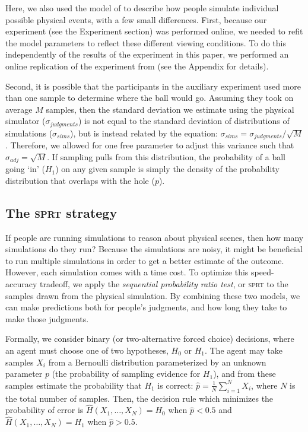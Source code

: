 \documentclass[10pt,letterpaper]{article}
\begin{document}
Here, we also used the model of  to describe how people simulate individual possible physical events, with a few small differences.
First, because our experiment (see the Experiment section) was performed online, we needed to refit the model parameters to reflect these different viewing conditions.
To do this independently of the results of the experiment in this paper, we performed an online replication of the experiment from  (see the Appendix for details).

Second, it is possible that the participants in the auxiliary experiment used more than one sample to determine where the ball would go.
Assuming they took on average $M$ samples, then the standard deviation we estimate using the physical simulator ($\sigma_{judgments}$) is not equal to the standard deviation of distributions of simulations ($\sigma_{sims}$), but is instead related by the equation: $\sigma_{sims} = \sigma_{judgments} / \sqrt{M}$.
Therefore, we allowed for one free parameter to adjust this variance such that $\sigma_{adj}=\sqrt{M}$.
If sampling pulls from this distribution, the probability of a ball going `in' ($H_1$) on any given sample is simply the density of the probability distribution that overlaps with the hole ($p$).

\subsection{The \textsc{sprt} strategy}

If people are running simulations to reason about physical scenes, then how many simulations do they run?
Because the simulations are noisy, it might be beneficial to run multiple simulations in order to get a better estimate of the outcome.
However, each simulation comes with a time cost.
To optimize this speed-accuracy tradeoff, we apply the \emph{sequential probability ratio test}, or \textsc{sprt} \cite{wald1947sequential} to the samples drawn from the physical simulation.
By combining these two models, we can make predictions both for people's judgments, and how long they take to make those judgments.

Formally, we consider binary (or two-alternative forced choice) decisions, where an agent must choose one of two hypotheses, $H_0$ or $H_1$. 
The agent may take samples $X_i$ from a Bernoulli distribution parameterized by an unknown parameter $p$ (the probability of sampling evidence for $H_1$), and from these samples estimate the probability that $H_1$ is correct: $\hat{p}=\frac{1}{N}\sum_{i=1}^N X_i$, where $N$ is the total number of samples. 
Then, the decision rule which minimizes the probability of error is $\hat{H}(X_1,\ldots{},X_N)=H_0$ when $\hat{p}<0.5$ and $\hat{H}(X_1,\ldots{},X_N)=H_1$ when $\hat{p}>0.5$.
\end{document}
